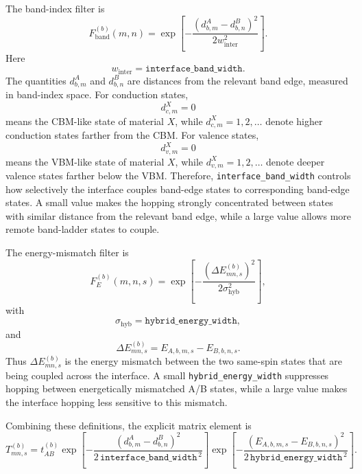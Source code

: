 \documentclass[11pt,a4paper]{article}
\begin{document}
The band-index filter is
\begin{equation}
F_{\mathrm{band}}^{(b)}(m,n)
=
\exp\left[
-\frac{
\left(d^{A}_{b,m}-d^{B}_{b,n}\right)^2
}{
2w_{\mathrm{inter}}^2
}
\right].
\end{equation}
Here
\begin{equation}
w_{\mathrm{inter}}
=
\texttt{interface\_band\_width}.
\end{equation}
The quantities \(d^{A}_{b,m}\) and \(d^{B}_{b,n}\) are distances from the relevant band edge, measured in band-index space.  For conduction states,
\begin{equation}
d^{X}_{c,m}=0
\end{equation}
means the CBM-like state of material \(X\), while \(d^{X}_{c,m}=1,2,\ldots\) denote higher conduction states farther from the CBM.  For valence states,
\begin{equation}
d^{X}_{v,m}=0
\end{equation}
means the VBM-like state of material \(X\), while \(d^{X}_{v,m}=1,2,\ldots\) denote deeper valence states farther below the VBM.  Therefore, \texttt{interface\_band\_width} controls how selectively the interface couples band-edge states to corresponding band-edge states.  A small value makes the hopping strongly concentrated between states with similar distance from the relevant band edge, while a large value allows more remote band-ladder states to couple.

The energy-mismatch filter is
\begin{equation}
F_E^{(b)}(m,n,s)
=
\exp\left[
-\frac{
\left(\Delta E^{(b)}_{mn,s}\right)^2
}{
2\sigma_{\mathrm{hyb}}^2
}
\right],
\end{equation}
with
\begin{equation}
\sigma_{\mathrm{hyb}}
=
\texttt{hybrid\_energy\_width},
\end{equation}
and
\begin{equation}
\Delta E^{(b)}_{mn,s}
=
E_{A,b,m,s}
-
E_{B,b,n,s}.
\end{equation}
Thus \(\Delta E^{(b)}_{mn,s}\) is the energy mismatch between the two same-spin states that are being coupled across the interface.  A small \texttt{hybrid\_energy\_width} suppresses hopping between energetically mismatched A/B states, while a large value makes the interface hopping less sensitive to this mismatch.

Combining these definitions, the explicit matrix element is
\begin{equation}
T^{(b)}_{mn,s}
=
t^{(b)}_{AB}
\exp\left[
-\frac{
\left(d^{A}_{b,m}-d^{B}_{b,n}\right)^2
}{
2\,\texttt{interface\_band\_width}^{\,2}
}
\right]
\exp\left[
-\frac{
\left(E_{A,b,m,s}-E_{B,b,n,s}\right)^2
}{
2\,\texttt{hybrid\_energy\_width}^{\,2}
}
\right].
\end{equation}
\end{document}
